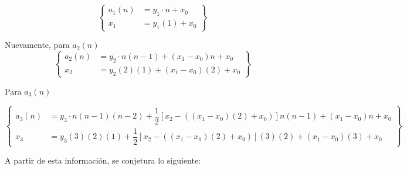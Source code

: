 \documentclass{article}
\begin{document}
\begin{equation*}
    \left\{
        \begin{aligned}
            a_1(n) &= y_1 \cdot n + x_0\\
            x_1 &= y_1(1) + x_0
        \end{aligned}
    \right\}
\end{equation*}

Nuevamente, para $a_2(n)$
\begin{equation*}
    \left\{
        \begin{aligned}
            a_2(n) &= y_2 \cdot n(n-1) + (x_1 - x_0)n + x_0\\
            x_2 &= y_2(2)(1) + (x_1 - x_0)(2) + x_0
        \end{aligned}  
    \right\}
\end{equation*}

Para $a_3(n)$

\begin{equation*}
    \left\{
        \begin{aligned}
            a_3(n) &= y_3 \cdot n(n-1)(n-2) + \dfrac{1}{2}[x_2 - ((x_1  - x_0)(2) + x_0)]n(n-1) + (x_1 - x_0)n + x_0\\
            x_3 &= y_3 (3)(2)(1) + \dfrac{1}{2}[x_2 - ((x_1  - x_0)(2) + x_0)](3)(2) + (x_1 - x_0)(3) + x_0
        \end{aligned}
    \right\}
\end{equation*}

A partir de esta información, se conjetura lo siguiente:
\end{document}
